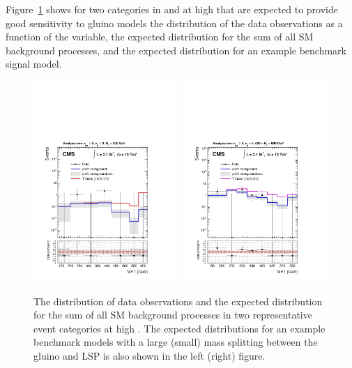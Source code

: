 Figure~\ref{fig:mht-templates} shows for two categories in \njet and
\nb at high \scalht that are expected to provide good sensitivity to
gluino models the distribution of the data observations as a function
of the \mht variable, the expected distribution for the sum of all SM
background processes, and the expected distribution for an example
benchmark signal model.

\begin{figure}[tbhp]
  \begin{center}
    \includegraphics[width=0.48\textwidth]{postFitShape_ge3b_ge5j_800_Inf_prefit} \,
    \includegraphics[width=0.48\textwidth]{postFitShape_eq2b_ge5j_600_800_prefit} \\
  \end{center}
    \caption{ The \mht distribution of data observations and the expected
      distribution for the sum of all SM background processes in two
      representative event categories at high \scalht. The expected
      distributions for an example benchmark models with a large (small)
      mass splitting between the gluino and LSP is also shown in the left
      (right) figure. \label{fig:mht-templates} } 
  \end{figure}


